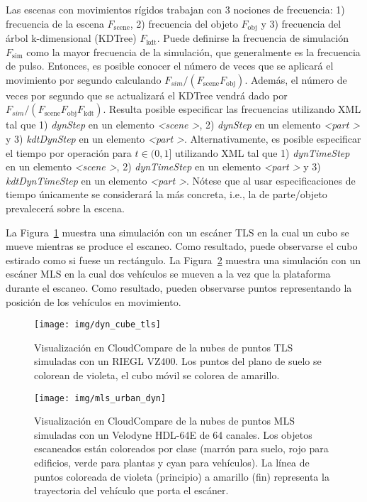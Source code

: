\documentclass[]{article}
\begin{document}
	Las escenas con movimientos rígidos trabajan con 3 nociones de frecuencia: 1) frecuencia de la escena $F_{\mathrm{scene}}$, 2) frecuencia del objeto $F_{\mathrm{obj}}$ y 3) frecuencia del árbol k-dimensional (KDTree) $F_{\mathrm{kdt}}$. Puede definirse la frecuencia de simulación $F_{\mathrm{sim}}$ como la mayor frecuencia de la simulación, que generalmente es la frecuencia de pulso. Entonces, es posible conocer el número de veces que se aplicará el movimiento por segundo calculando $F_{sim}/(F_{\mathrm{scene}} F_{\mathrm{obj}})$. Además, el número de veces por segundo que se actualizará el KDTree vendrá dado por $F_{sim}/(F_{\mathrm{scene}} F_{\mathrm{obj}} F_{\mathrm{kdt}})$. Resulta posible especificar las frecuencias utilizando XML tal que 1) \textit{dynStep} en un elemento \textit{\textless scene \textgreater}, 2) \textit{dynStep} en un elemento \textit{\textless part \textgreater} y 3) \textit{kdtDynStep} en un elemento \textit{\textless part \textgreater}. Alternativamente, es posible especificar el tiempo por operación para $t \in (0, 1]$ utilizando XML tal que 1) \textit{dynTimeStep} en un elemento \textit{\textless scene \textgreater}, 2) \textit{dynTimeStep} en un elemento \textit{\textless part \textgreater} y 3) \textit{kdtDynTimeStep} en un elemento \textit{\textless part \textgreater}. Nótese que al usar especificaciones de tiempo únicamente se considerará la más concreta, i.e., la de parte/objeto prevalecerá sobre la escena.
	
	La Figura~\ref{fig:cubo_animado} muestra una simulación con un escáner TLS en la cual un cubo se mueve mientras se produce el escaneo. Como resultado, puede observarse el cubo estirado como si fuese un rectángulo. La Figura~\ref{fig:coches_animados} muestra una simulación con un escáner MLS en la cual dos vehículos se mueven a la vez que la plataforma durante el escaneo. Como resultado, pueden observarse puntos representando la posición de los vehículos en movimiento.

	\begin{figure}[H]
		\centering
		\texttt{[image: img/dyn\_cube\_tls]}
		\caption{Visualización en CloudCompare de la nubes de puntos TLS simuladas con un RIEGL VZ400. Los puntos del plano de suelo se colorean de violeta, el cubo móvil se colorea de amarillo.}
		\label{fig:cubo_animado}
	\end{figure}

	\begin{figure}[H]
		\centering
		\texttt{[image: img/mls\_urban\_dyn]}
		\caption{Visualización en CloudCompare de la nubes de puntos MLS simuladas con un Velodyne HDL-64E de 64 canales. Los objetos escaneados están coloreados por clase (marrón para suelo, rojo para edificios, verde para plantas y cyan para vehículos). La línea de puntos coloreada de violeta (principio) a amarillo (fin) representa la trayectoria del vehículo que porta el escáner.}
		\label{fig:coches_animados}
	\end{figure}
\end{document}
